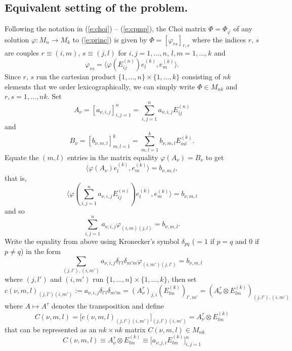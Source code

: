 \documentclass[12pt]{amsart}
\theoremstyle{definition}
\begin{document}
\subsection{Equivalent setting of the problem.}\label{ss:esp}
 Following 
the notation in (\ref{e:choi}) -- (\ref{e:cpmp}), the Choi matrix $\Phi =\Phi_\varphi$ of any solution $\varphi :M_n \to M_k$ to (\ref{e:princ})  is given by
$\Phi =[\varphi_{rs}]_{r,s}$ where the indices $r,\, s$  are couples $r\equiv (i,m)$, $s\equiv (j,l)$ for $i,j=1,\ldots ,n$,  $l,m=1,\ldots ,k$ and $$\varphi_{rs}
=\langle \varphi (E_{ij}^{(n)})e_{l}^{(k)},e_{m}^{(k)}\rangle .$$ 
Since $r,\, s$ run  the cartesian product $\{ 1,\ldots ,n\}\times \{ 1,\ldots , k\}$
 consisting of $nk$ elements that we  order lexicographically, we can simply write $\Phi \in M_{nk}$ and   $r,s=1,\ldots ,nk$. 
Set
$$
A_\nu =[a_{\nu ,i,j}]_{i,j=1}^n =\sum_{i,j=1}^n a_{\nu ,i,j} E^{(n)}_{ij}
 $$
and 
$$
B_\nu =[b_{\nu ,m,l}]_{m,l=1}^ k =\sum_{m,l=1}^k b_{\nu ,m,l} E^{(k)}_{ml}.
 $$
Equate the $(m,l)$ entries in the matrix equality $\varphi (A_\nu) =B_\nu$ to get $$\langle \varphi (A_\nu )e_{l}^{(k)},e_{m}^{(k)}\rangle =b_{\nu, m, l}, $$ that is,
$$
\langle \varphi (\sum_{i,j=1}^n a_{\nu ,i,j}E^{(n)}_{ij} )e_{l}^{(k)},e_{m}^{(k)}\rangle =b_{\nu, m,l}
$$
and so 
\begin{equation}\label{simetric}
\sum_{i,j=1}^n a_{\nu ,i,j}\varphi_{(i,m)(j,l)}=b_{\nu ,m,l}.
\end{equation}
Write the equality from above using Kronecker's symbol $\delta_{pq}$ ($=1$ if $p=q$ and $0$ if $p\not =q$) in the form
$$
\sum_{(j,l'),(i,m')}a_{\nu ,i,j}\delta_{l'l}\delta_{m'm}\varphi_{(i,m')(j,l')}=b_{\nu ,m,l}
$$
where  $(j,l')$ and $ (i,m')$ run   $\{ 1,\ldots ,n\} \times \{ 1,\ldots ,k \}$,
then set
\begin{equation}\label{aiota}
c(\nu ,m,l)_{(j,l')(i,m')}:=a_{\nu ,i,j}\delta_{l'l}\delta_{m'm}=(A_{\nu}^\tau )_{j,i}(E_{lm}^{(k)})_{l',m'}=(A_{\nu}^\tau \otimes E_{lm}^{(k)})_{(j,l'),(i,m')}
\end{equation}
where $A\mapsto A^\tau$ denotes the transposition and define 
\begin{equation}\label{aiota2}
C(\nu ,m,l)=\big[ c(\nu ,m,l)_{(j,l')(i,m')}\big]_{(j,l')(i,m')}=A_{\nu}^{\tau}\otimes E^{(k)}_{lm}
\end{equation}
that can be  represented as an $nk\times nk$ matrix  $C(\nu ,m,l)\in M_{nk}$
 \begin{equation}\label{dtp}C(\nu ,m,l)\equiv A_{\nu}^\tau \otimes   E_{lm}^{(k)}\equiv \big[     a_{\nu ,  j,i  }E_{lm}^{(k)}  \big]_{i,j=1}^n  \end{equation}
\end{document}
